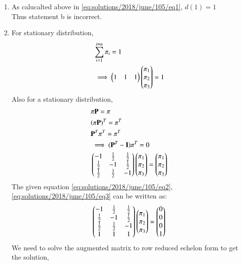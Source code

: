 \begin{enumerate}
    \item{As calucalted above in \ref{eq:solutions/2018/june/105/eq1}, $d(1)=1$\\
    Thus statement b is incorrect.}\\
    \item{For stationary distribution,
    \begin{align}
    &\sum_{i=1}^{i=n} \pi_i = 1 \\
    &\implies\begin{pmatrix}1&1&1\end{pmatrix}\begin{pmatrix}\pi_1\\\pi_2\\\pi_3\end{pmatrix}=1\label{eq:solutions/2018/june/105/eq2}
    \end{align}
    Also for a stationary distribution,
    \begin{align}
    &\pi \mathbf{P} = \pi \\
    &(\pi \mathbf{P})^T = \pi^T \\
    &\mathbf{P}^T\pi^T=\pi^T\\
    &\implies (\mathbf{P}^T-\mathbf{I})\pi^T=0\\
    &\begin{pmatrix}-1&\frac{1}{2}&\frac{1}{2}\\\frac{1}{2}&-1&\frac{1}{2}\\\frac{1}{2}&\frac{1}{2}&-1\end{pmatrix}\begin{pmatrix}\pi_1\\\pi_2\\\pi_3\end{pmatrix}=\begin{pmatrix}\pi_1\\\pi_2\\\pi_3\end{pmatrix} \label{eq:solutions/2018/june/105/eq3}  
\end{align}
    The given equation \ref{eq:solutions/2018/june/105/eq2}, \ref{eq:solutions/2018/june/105/eq3} can be written as:\\
    \begin{align}
    \begin{pmatrix}-1&\frac{1}{2}&\frac{1}{2}\\\frac{1}{2}&-1&\frac{1}{2}\\\frac{1}{2}&\frac{1}{2}&-1\\1&1&1\end{pmatrix}\begin{pmatrix}\pi_1\\\pi_2\\\pi_3\end{pmatrix}=\begin{pmatrix}0\\0\\0\\1\end{pmatrix}
    \end{align}
    We need to solve the augmented matrix to row reduced echelon form to get the solution,    
    \begin{align}

\end{align}}
\end{enumerate}
